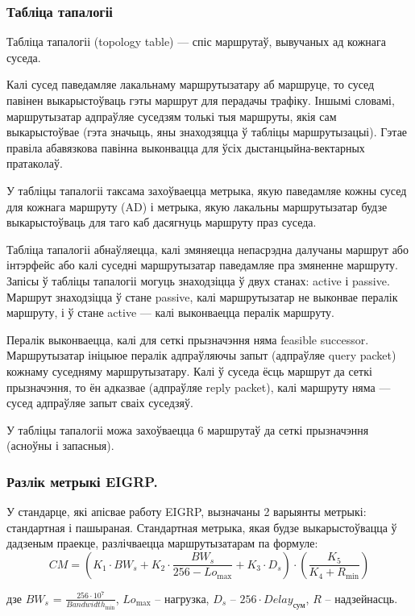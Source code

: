\subsubsection{Табліца тапалогіі}

Табліца тапалогіі (topology table) --- спіс маршрутаў, вывучаных ад кожнага суседа.

Калі сусед паведамляе лакальнаму маршрутызатару аб маршруце, то сусед павінен выкарыстоўваць гэты маршрут для перадачы трафіку. Іншымі словамі, маршрутызатар адпраўляе суседзям толькі тыя маршруты, якія сам выкарыстоўвае (гэта значыць, яны знаходзяцца ў табліцы маршрутызацыі).
Гэтае правіла абавязкова павінна выконвацца для ўсіх дыстанцыйна-вектарных пратаколаў.

У табліцы тапалогіі таксама захоўваецца метрыка, якую паведамляе кожны сусед для кожнага маршруту (AD) і метрыка, якую лакальны маршрутызатар будзе выкарыстоўваць для таго каб дасягнуць маршруту праз суседа.

Табліца тапалогіі абнаўляецца, калі змяняецца непасрэдна далучаны маршрут або інтэрфейс або калі суседні маршрутызатар паведамляе пра змяненне маршруту.
Запісы ў табліцы тапалогіі могуць знаходзіцца ў двух станах: active і passive.
Маршрут знаходзіцца ў стане passive, калі маршрутызатар не выконвае пералік маршруту, і ў стане active --- калі выконваецца пералік маршруту.

Пералік выконваецца, калі для сеткі прызначэння няма feasible successor. Маршрутызатар ініцыюе пералік адпраўляючы запыт (адпраўляе query packet) кожнаму суседняму маршрутызатару. Калі ў суседа ёсць маршрут да сеткі прызначэння, то ён адказвае (адпраўляе reply packet), калі маршруту няма --- сусед адпраўляе запыт сваіх суседзяў.

У табліцы тапалогіі можа захоўваецца 6 маршрутаў да сеткі прызначэння (асноўны і запасныя).

\subsubsection{Разлік метрыкі EIGRP.}

У стандарце, які апісвае работу EIGRP, вызначаны 2 варыянты метрыкі:
стандартная і пашыраная. Стандартная метрыка, якая будзе выкарыстоўвацца ў дадзеным праекце, разлічваецца маршрутызатарам
па формуле:
\begin{equation}
    CM = \left(K_1 \cdot BW_s + K_2 \cdot \frac{BW_s}{256 -Lo_\text{max}} + K_3 \cdot D_s\right) \cdot \left(\frac{K_5}{K_4 + R_\text{min}}\right)
\end{equation}
\begin{Explanation}
    \item[дзе] $BW_s$ = $\frac{256 \cdot 10^7}{Bandwidth_\text{min}}$,
    $Lo_\text{max}$ -- нагрузка,
    $D_s$ -- $256 \cdot Delay_\text{сум}$,
    $R$ -- надзейнасць.
\end{Explanation}

